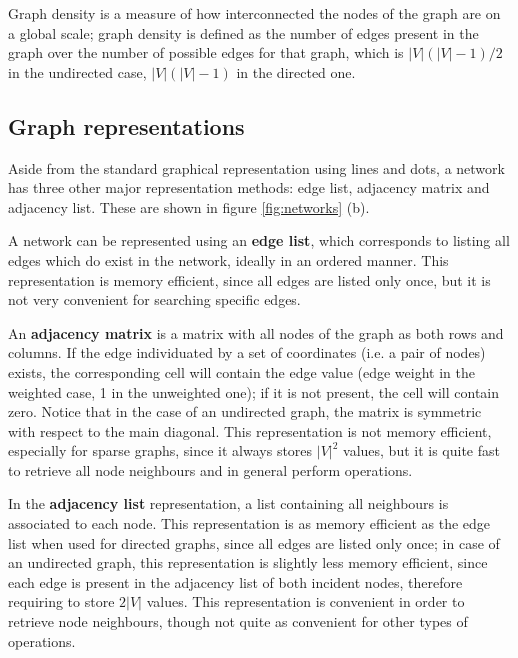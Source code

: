 Graph density is a measure of how interconnected the nodes of the graph are on a global scale; graph density is defined as the number of edges present in the graph over the number of possible edges for that graph, which is $|V|(|V|-1)/2$ in the undirected case, $|V|(|V|-1)$ in the directed one. 

\subsection{Graph representations} 

Aside from the standard graphical representation using lines and dots, a network has three other major representation methods: edge list, adjacency matrix and adjacency list. These are shown in figure \ref{fig:networks} (b).

A network can be represented using an \textbf{edge list}, which corresponds to listing all edges which do exist in the network, ideally in an ordered manner. This representation is memory efficient, since all edges are listed only once, but it is not very convenient for searching specific edges.

An \textbf{adjacency matrix} is a matrix with all nodes of the graph as both rows and columns. If the edge individuated by a set of coordinates (i.e. a pair of nodes) exists, the corresponding cell will contain the edge value (edge weight in the weighted case, 1 in the unweighted one); if it is not present, the cell will contain zero. Notice that in the case of an undirected graph, the matrix is symmetric with respect to the main diagonal. This representation is not memory efficient, especially for sparse graphs, since it always stores $|V|^2$ values, but it is quite fast to retrieve all node neighbours and in general perform operations. 

In the \textbf{adjacency list} representation, a list containing all neighbours is associated to each node. This representation is as memory efficient as the edge list when used for directed graphs, since all edges are listed only once; in case of an undirected graph, this representation is slightly less memory efficient, since each edge is present in the adjacency list of both incident nodes, therefore requiring to store $2|V|$ values. This representation is convenient in order to retrieve node neighbours, though not quite as convenient for other types of operations. 

